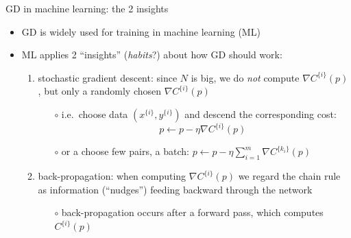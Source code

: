 \documentclass[xcolor={svgnames},
               hyperref={colorlinks,citecolor=DeepPink4,linkcolor=FireBrick,urlcolor=Maroon}]
               {beamer}
\newcommand{\grad}{\nabla}
\begin{document}
\begin{frame}{GD in machine learning: the 2 insights}

\begin{itemize}
\item GD is widely used for training in \alert{machine learning} (ML)
\item ML applies 2 ``insights'' (\emph{habits}?) about how GD should work:
    \begin{enumerate}
    \item \alert{stochastic gradient descent}: since $N$ is big, we do \emph{not} compute $\grad C^{\{i\}}(p)$, but only a randomly chosen $\grad C^{\{i\}}(p)$
        \begin{itemize}
        \item[$\circ$] i.e.~choose data $(x^{\{i\}},y^{\{i\}})$ and descend the corresponding cost:
            $$p \gets p - \eta \grad C^{\{i\}}(p)$$
        \item[$\circ$] or a choose few pairs, a \alert{batch}: $p \gets p - \eta \sum_{i=1}^m \grad C^{\{k_i\}}(p)$
        \end{itemize}
    \item \alert{back-propagation}: when computing $\grad C^{\{i\}}(p)$ we regard the chain rule as information (``nudges'') feeding backward through the network
        \begin{itemize}
        \item[$\circ$] back-propagation occurs after a forward pass, which computes $C^{\{i\}}(p)$
        \end{itemize}
    \end{enumerate}
\end{itemize}
\end{frame}
\end{document}
